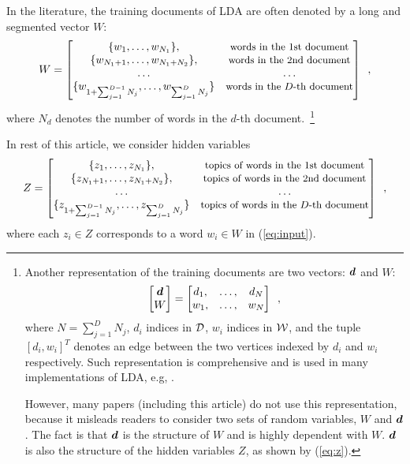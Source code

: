 In the literature, the training documents of LDA are often denoted by
a long and segmented vector $W$:
\begin{equation}
  \label{eq:input}
  \begin{split}
  W =
  \begin{bmatrix}
    \{ w_1,\ldots,w_{N_1} \},  &  \text{\small words in the 1st document} \\
    \{ w_{N_1+1},\ldots,w_{N_1+N_2} \},  &  \text{\small words in the 2nd document} \\
    \ldots & \ldots \\
    \{ w_{1+\sum_{j=1}^{D-1}N_j}, \ldots, w_{\sum_{j=1}^{D}N_j} \} & \text{\small words in the $D$-th document}
  \end{bmatrix}
  \enspace,
  \end{split}
\end{equation}
where $N_d$ denotes the number of words in the $d$-th
document.~\footnote{Another representation of the training documents
  are two vectors: $\boldsymbol{d}$ and $W$:
\begin{equation}
  \label{eq:bad-input}
  \begin{bmatrix}
    \boldsymbol{d} \\
    W
  \end{bmatrix}
  =
  \begin{bmatrix}
    d_1, & \ldots, & d_N \\
    w_1, & \ldots, & w_N
  \end{bmatrix}
  \enspace,
\end{equation}
where $N=\sum_{j=1}^DN_j$, $d_i$ indices in $\mathcal{D}$, $w_i$ indices
in $\mathcal{W}$, and the tuple $[d_i,w_i]^T$ denotes an edge between the
two vertices indexed by $d_i$ and $w_i$ respectively.  Such
representation is comprehensive and is used in many implementations of
LDA, e.g, \cite{topic_modeling_toolbox}.

However, many papers (including this article) do not use this
representation, because it misleads readers to consider two sets of
random variables, $W$ and $\boldsymbol{d}$.  The fact is that $\boldsymbol{d}$ is the
structure of $W$ and is highly dependent with $W$.  $\boldsymbol{d}$ is also
the structure of the hidden variables $Z$, as shown by (\ref{eq:z}).}

In rest of this article, we consider hidden variables
\begin{equation}
  \label{eq:z}
  \begin{split}
  Z =
  \begin{bmatrix}
    \{ z_1,\ldots,z_{N_1} \},  &  \text{\small topics of words in the 1st document} \\
    \{ z_{N_1+1},\ldots,z_{N_1+N_2} \},  &  \text{\small topics of words in the 2nd document} \\
    \ldots & \ldots \\
    \{ z_{1+\sum_{j=1}^{D-1}N_j}, \ldots, z_{\sum_{j=1}^{D}N_j} \} & \text{\small topics of words in the $D$-th document}
  \end{bmatrix}
  \enspace,
  \end{split}
\end{equation}
where each $z_i\in{}Z$ corresponds to a word $w_i\in{}W$ in
(\ref{eq:input}).


